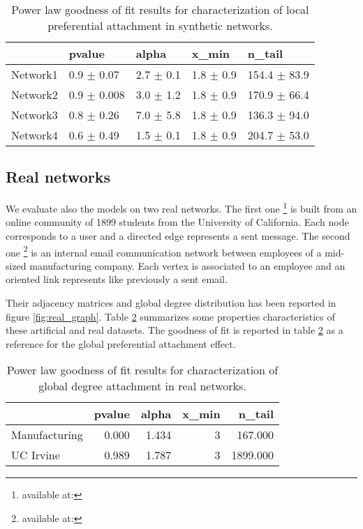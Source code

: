 \documentclass[a4paper, 12pt]{article}
\begin{document}
\begin{table}[h]
\caption{Power law goodness of fit results for characterization of local preferential attachment in synthetic networks.}
\centering
    \begin{tabular}{lllll}
    \hline
    & pvalue          & alpha           & x\_min        & n\_tail           \\
    \hline
    Network1 & 0.9 $\pm$ 0.07  & 2.7 $\pm$ 0.1 & 1.8 $\pm$ 0.9 & 154.4 $\pm$ 83.9 \\
    Network2 & 0.9 $\pm$ 0.008 & 3.0 $\pm$ 1.2  & 1.8 $\pm$ 0.9 & 170.9 $\pm$ 66.4  \\
    Network3 & 0.8 $\pm$ 0.26 & 7.0 $\pm$ 5.8 & 1.8 $\pm$ 0.9 & 136.3 $\pm$ 94.0 \\
    Network4 & 0.6 $\pm$ 0.49    & 1.5 $\pm$ 0.1 & 1.8 $\pm$ 0.9 & 204.7 $\pm$ 53.0 \\
    \hline
    \end{tabular}
\label{table:synt_graph_local}
\end{table}


\subsection{Real networks}

We evaluate also the models on two  real networks.
The first one \footnote{available at:} is built from an online community of 1899 students from the University of California. Each node corresponds to a user and a    directed edge represents a sent message.
The second one \footnote{available at:} is an internal email communication network between employees of a mid-sized manufacturing company. Each vertex is associated  to an employee and an oriented link represents like previously a sent email.

Their adjacency matrices and global degree distribution has been reported in figure \ref{fig:real_graph}.  Table \ref{table:real_graph} summarizes some properties characteristics of these artificial and real datasets. The goodness of fit is reported in table \ref{table:real_graph}  as a reference for the global preferential attachment effect. 



\begin{table}
\caption{Power law goodness of fit results for characterization of global degree attachment in real networks.}
\centering
\begin{tabular}{lrrrr}
   &   pvalue &   alpha &   x\_min &   n\_tail \\
\hline
 Manufacturing &    0.000 &   1.434 &       3 &  167.000 \\
 UC Irvine     &    0.989 &   1.787 &       3 & 1899.000 \\
\hline
\end{tabular}
\label{table:real_graph}
\end{table}
\end{document}
